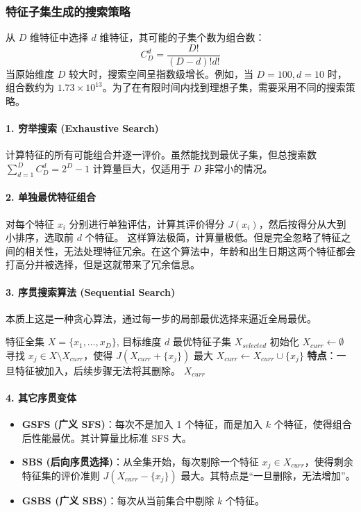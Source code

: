 \subsubsection{特征子集生成的搜索策略}
从 $D$ 维特征中选择 $d$ 维特征，其可能的子集个数为组合数：
\[ C_D^d = \frac{D!}{(D-d)!d!} \]
当原始维度 $D$ 较大时，搜索空间呈指数级增长。例如，当 $D=100, d=10$ 时，组合数约为 $1.73 \times 10^{13}$。为了在有限时间内找到理想子集，需要采用不同的搜索策略。

\paragraph{1. 穷举搜索 (Exhaustive Search)}
计算特征的所有可能组合并逐一评价。虽然能找到最优子集，但总搜索数 $\sum_{d=1}^{D} C_D^d = 2^D - 1$ 计算量巨大，仅适用于 $D$ 非常小的情况。

\paragraph{2. 单独最优特征组合}
对每个特征 $x_i$ 分别进行单独评估，计算其评价得分 $J(x_i)$，然后按得分从大到小排序，选取前 $d$ 个特征。
这样算法极简，计算量极低。但是完全忽略了特征之间的相关性，无法处理特征冗余。在这个算法中，年龄和出生日期这两个特征都会打高分并被选择，但是这就带来了冗余信息。

\paragraph{3. 序贯搜索算法 (Sequential Search)}
本质上这是一种贪心算法，通过每一步的局部最优选择来逼近全局最优。

\begin{algorithm}[H]
\caption{前向序贯选择算法 (SFS)}
\begin{algorithmic}[1]
    \Require 特征全集 $X = \{x_1, \dots, x_D\}$, 目标维度 $d$
    \Ensure 最优特征子集 $X_{selected}$
    \State 初始化 $X_{curr} \gets \emptyset$
        \State 寻找 $x_j \in X \setminus X_{curr}$，使得 $J(X_{curr} + \{x_j\})$ 最大
        \State $X_{curr} \gets X_{curr} \cup \{x_j\}$
    \EndFor
    \State \textbf{特点}：一旦特征被加入，后续步骤无法将其删除。
    \State \Return $X_{curr}$
\end{algorithmic}
\end{algorithm}

\paragraph{4. 其它序贯变体}
\begin{itemize}
    \item \textbf{GSFS (广义 SFS)}：每次不是加入 1 个特征，而是加入 $k$ 个特征，使得组合后性能最优。其计算量比标准 SFS 大。
    \item \textbf{SBS (后向序贯选择)}：从全集开始，每次剔除一个特征 $x_j \in X_{curr}$，使得剩余特征集的评价准则 $J(X_{curr} - \{x_j\})$ 最大。其特点是“一旦删除，无法增加”。
    \item \textbf{GSBS (广义 SBS)}：每次从当前集合中剔除 $k$ 个特征。
\end{itemize}

